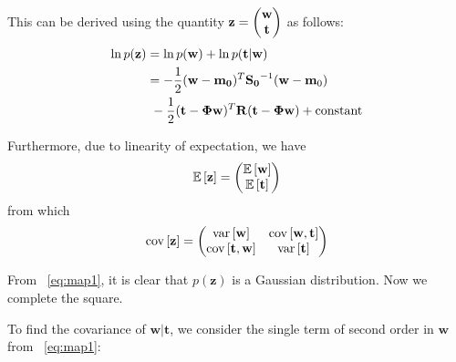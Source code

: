 \documentclass[reqno]{amsart}
\begin{document}
\begin{enumerate}[label=\textbf{(\Roman*)}]
\begin{enumerate}[label=\textbf{(\alph*)}]

                This can be derived using the quantity \(\mathbf{z} = \begin{pmatrix}\mathbf{w} \\ \mathbf{t}\end{pmatrix}\) as follows:
                \begin{align}
                    \begin{split}
                        \ln p(\mathbf{z}) &= \ln p(\mathbf{w}) + \ln p(\mathbf{t|w}) \\
                            &= -\frac{1}{2} (\mathbf{w - m_0})^T \mathbf{S_0}^{-1} (\mathbf{w - m}_0) \\
                            &\ - \frac{1}{2} (\mathbf{t - \Phi w})^T \mathbf{R} (\mathbf{t - \Phi w}) + \text{constant} \label{eq:map1}
                    \end{split}
                \end{align}

                Furthermore, due to linearity of expectation, we have 
                \[\mathbb{E}\left[\mathbf{z}\right] = \begin{pmatrix}\mathbb{E}\left[\mathbf{w}\right] \\ \mathbb{E}\left[\mathbf{t}\right]\end{pmatrix}\]
                from which
                \[\text{cov}\left[\mathbf{z}\right] = \begin{pmatrix}
                    \text{var}\left[\mathbf{w}\right] & \text{cov}\left[\mathbf{w}, \mathbf{t}\right] \\
                    \text{cov}\left[\mathbf{t}, \mathbf{w}\right] & \text{var}\left[\mathbf{t}\right]
                \end{pmatrix}\]


                From ~\ref{eq:map1}, it is clear that \(p(\mathbf{z})\) is a Gaussian distribution. Now we complete the square.
                
                To find the covariance of \(\mathbf{w|t}\), we consider the single term of second order in \(\mathbf{w}\) from ~\ref{eq:map1}: 


\end{enumerate}
\end{enumerate}
\end{document}
